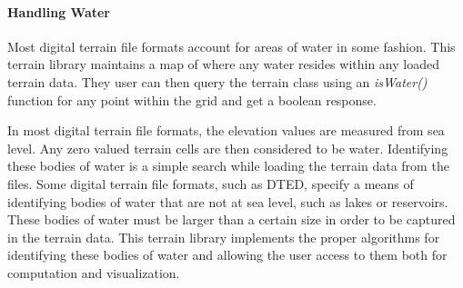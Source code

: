 \paragraph{Handling Water}
Most digital terrain file formats account for areas of water in some fashion.  This terrain library maintains a map of where any water resides within any loaded terrain data.  They user can then query the terrain class using an \textit{isWater()} function for any point within the grid and get a boolean response.

In most digital terrain file formats, the elevation values are measured from sea level.  Any zero valued terrain cells are then considered to be water.  Identifying these bodies of water is a simple search while loading the terrain data from the files.  Some digital terrain file formats, such as DTED, specify a means of identifying bodies of water that are not at sea level, such as lakes or reservoirs.  These bodies of water must be larger than a certain size in order to be captured in the terrain data.  This terrain library implements the proper algorithms for identifying these bodies of water and allowing the user access to them both for computation and visualization.

